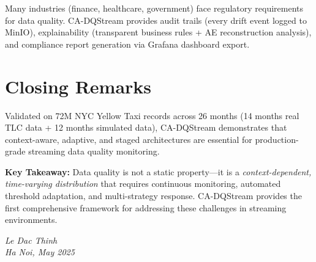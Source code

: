 Many industries (finance, healthcare, government) face regulatory requirements for data quality. CA-DQStream provides audit trails (every drift event logged to MinIO), explainability (transparent business rules + AE reconstruction analysis), and compliance report generation via Grafana dashboard export.

\section{Closing Remarks}

Validated on 72M NYC Yellow Taxi records across 26 months (14 months real TLC data + 12 months simulated data), CA-DQStream demonstrates that context-aware, adaptive, and staged architectures are essential for production-grade streaming data quality monitoring.

\textbf{Key Takeaway:} Data quality is not a static property---it is a \emph{context-dependent, time-varying distribution} that requires continuous monitoring, automated threshold adaptation, and multi-strategy response. CA-DQStream provides the first comprehensive framework for addressing these challenges in streaming environments.

\vspace{2cm}
\begin{flushright}
\textit{Le Dac Thinh} \\
\textit{Ha Noi, May 2025}
\end{flushright}
